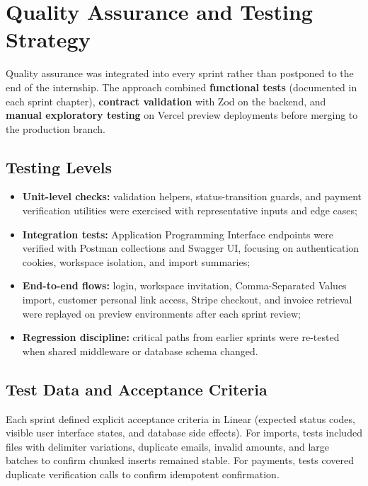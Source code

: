 \documentclass[12pt,a4paper]{report}
\begin{document}
\section{Quality Assurance and Testing Strategy}
\label{sec:qa}

Quality assurance was integrated into every sprint rather than postponed to the end
of the internship.
The approach combined \textbf{functional tests} (documented in each sprint chapter),
\textbf{contract validation} with Zod on the backend, and \textbf{manual exploratory
testing} on Vercel preview deployments before merging to the production branch.

\subsection{Testing Levels}

\begin{itemize}
  \item \textbf{Unit-level checks:} validation helpers, status-transition guards, and
        payment verification utilities were exercised with representative inputs and edge cases;
  \item \textbf{Integration tests:} Application Programming Interface endpoints were verified
        with Postman collections and Swagger UI, focusing on authentication cookies, workspace
        isolation, and import summaries;
  \item \textbf{End-to-end flows:} login, workspace invitation, Comma-Separated Values import,
        customer personal link access, Stripe checkout, and invoice retrieval were replayed on
        preview environments after each sprint review;
  \item \textbf{Regression discipline:} critical paths from earlier sprints were re-tested when
        shared middleware or database schema changed.
\end{itemize}

\subsection{Test Data and Acceptance Criteria}

Each sprint defined explicit acceptance criteria in Linear (expected status codes, visible
user interface states, and database side effects).
For imports, tests included files with delimiter variations, duplicate emails, invalid amounts,
and large batches to confirm chunked inserts remained stable.
For payments, tests covered duplicate verification calls to confirm idempotent confirmation.
\end{document}
